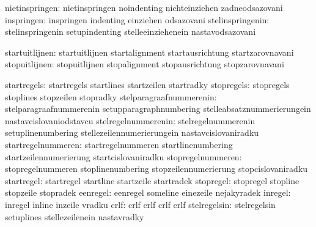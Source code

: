                nietinspringen:  nietinspringen               noindenting
                                nichteinziehen               zadneodsazovani
                   inspringen:  inspringen                   indenting
                                einziehen                    odsazovani
             stelinspringenin:  stelinspringenin             setupindenting
                                stelleeinziehenein           nastavodsazovani

               startuitlijnen:  startuitlijnen               startalignment
                                startausrichtung             startzarovnavani
                stopuitlijnen:  stopuitlijnen                stopalignment
                                stopausrichtung              stopzarovnavani

                  startregels:  startregels                  startlines
                                startzeilen                  startradky
                   stopregels:  stopregels                   stoplines
                                stopzeilen                   stopradky
      stelparagraafnummerenin:  stelparagraafnummerenin      setupparagraphnumbering
                                stelleabsatznummerierungein  nastavcislovaniodstavcu
          stelregelnummerenin:  stelregelnummerenin          setuplinenumbering
                                stellezeilennumerierungein   nastavcislovaniradku
           startregelnummeren:  startregelnummeren           startlinenumbering
                                startzeilennumerierung       startcislovaniradku
            stopregelnummeren:  stopregelnummeren            stoplinenumbering
                                stopzeilennumerierung        stopcislovaniradku
                   startregel:  startregel                   startline
                                startzeile                   startradek
                    stopregel:  stopregel                    stopline
                                stopzeile                    stopradek
                     eenregel:  eenregel                     someline
                                einezeile                    nejakyradek
                      inregel:  inregel                      inline
                                inzeile                      vradku
                         crlf:  crlf                         crlf
                                crlf                         crlf
                 stelregelsin:  stelregelsin                 setuplines
                                stellezeilenein              nastavradky

